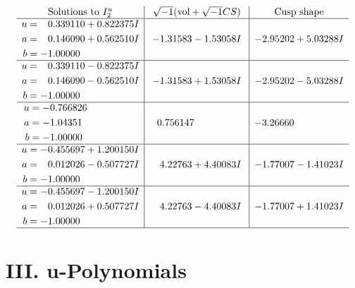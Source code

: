 \documentclass[1p]{elsarticle_modified}
\theoremstyle{definition}
\newcommand{\I}{\sqrt{-1}}
\begin{document}
$$\begin{array}{c|c|c}  
\text{Solutions to }I^u_{2}& \I (\text{vol} + \sqrt{-1}CS) & \text{Cusp shape}\\
 \hline 
\begin{aligned}
u &= \phantom{-}0.339110 + 0.822375 I \\
a &= \phantom{-}0.146090 + 0.562510 I \\
b &= -1.00000\phantom{ +0.000000I}\end{aligned}
 & -1.31583 - 1.53058 I & -2.95202 + 5.03288 I \\ \hline\begin{aligned}
u &= \phantom{-}0.339110 - 0.822375 I \\
a &= \phantom{-}0.146090 - 0.562510 I \\
b &= -1.00000\phantom{ +0.000000I}\end{aligned}
 & -1.31583 + 1.53058 I & -2.95202 - 5.03288 I \\ \hline\begin{aligned}
u &= -0.766826\phantom{ +0.000000I} \\
a &= -1.04351\phantom{ +0.000000I} \\
b &= -1.00000\phantom{ +0.000000I}\end{aligned}
 & \phantom{-}0.756147\phantom{ +0.000000I} & -3.26660\phantom{ +0.000000I} \\ \hline\begin{aligned}
u &= -0.455697 + 1.200150 I \\
a &= \phantom{-}0.012026 - 0.507727 I \\
b &= -1.00000\phantom{ +0.000000I}\end{aligned}
 & \phantom{-}4.22763 + 4.40083 I & -1.77007 - 1.41023 I \\ \hline\begin{aligned}
u &= -0.455697 - 1.200150 I \\
a &= \phantom{-}0.012026 + 0.507727 I \\
b &= -1.00000\phantom{ +0.000000I}\end{aligned}
 & \phantom{-}4.22763 - 4.40083 I & -1.77007 + 1.41023 I\\
 \hline 
 \end{array}$$\newpage
\newpage\renewcommand{\arraystretch}{1}
\centering \section*{ III. u-Polynomials}
\end{document}
